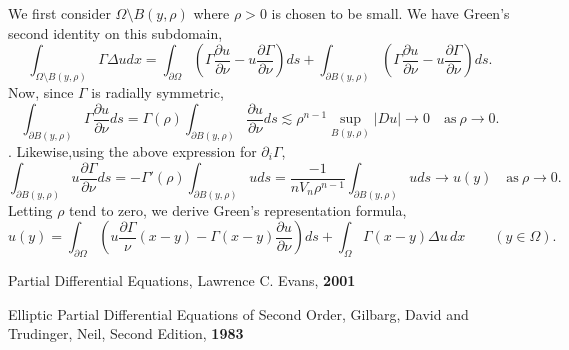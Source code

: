 \documentclass{article}
\begin{document}
We first consider $\Omega \setminus B(y, \rho)$ where $\rho > 0$ is chosen to be small.
We have Green's second identity on this subdomain,
\[
\int_{\Omega \setminus B(y,\rho)} \Gamma \Delta u dx = \int_{\partial \Omega} \left(\Gamma \frac{\partial u}{\partial \nu} - u \frac{\partial \Gamma}{\partial \nu}\right) ds + \int_{\partial B(y,\rho)} \left(\Gamma \frac{\partial u}{\partial \nu} - u \frac{\partial \Gamma}{\partial \nu}\right) ds.
\]
Now, since $\Gamma$ is radially symmetric,
\[
\int_{\partial B(y,\rho)} \Gamma \frac{\partial u}{\partial \nu} ds = \Gamma(\rho) \int_{\partial B(y,\rho)} \frac{\partial u}{\partial \nu} ds
\lesssim \rho^{n-1} \sup_{B(y,\rho)}|Du| \to 0 \quad \text{as}\ \rho \to 0.
\].
Likewise,using the above expression for $\partial_i \Gamma$,
\[
\int_{\partial B(y,\rho)} u \frac{\partial \Gamma}{\partial \nu} ds = -\Gamma'(\rho) \int_{\partial B(y,\rho)} u ds = \frac{-1}{n V_n \rho^{n-1}} \int_{\partial B(y,\rho)} u ds \to u(y)
\quad \text{as}\ \rho \to 0.
\]
Letting $\rho$ tend to zero, we derive Green's representation formula,
\begin{equation}
u(y) = \int_{\partial \Omega} \left( u \frac{\partial \Gamma}{\nu} (x-y) - \Gamma(x-y) \frac{\partial u}{\partial \nu} \right)ds + \int_{\Omega} \Gamma(x-y) \Delta u \, dx
\qquad (y \in \Omega).
\end{equation}

\begin{thebibliography}{99}
Partial Differential Equations,
Lawrence C. Evans,
\textbf{2001}

Elliptic Partial Differential Equations of Second Order,
Gilbarg, David and Trudinger, Neil,
Second Edition,
\textbf{1983}

\end{thebibliography}
\end{document}

